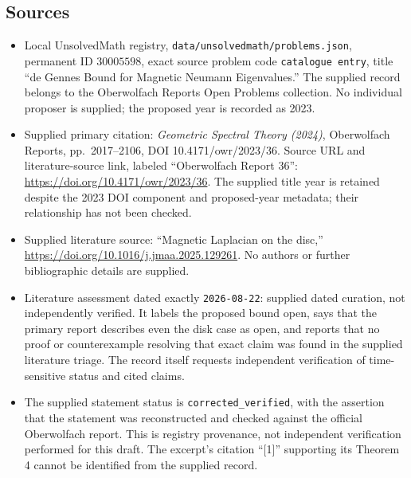 \documentclass[11pt]{article}
\begin{document}
\subsection{Sources}
\begin{itemize}
\item Local UnsolvedMath registry, \texttt{data/unsolvedmath/problems.json}, permanent ID \(30005598\), exact source problem code \texttt{catalogue entry}, title ``de Gennes Bound for Magnetic Neumann Eigenvalues.'' The supplied record belongs to the Oberwolfach Reports Open Problems collection. No individual proposer is supplied; the proposed year is recorded as 2023.
\item Supplied primary citation: \emph{Geometric Spectral Theory (2024)}, Oberwolfach Reports, pp.\ 2017--2106, DOI 10.4171/owr/2023/36. Source URL and literature-source link, labeled ``Oberwolfach Report 36'': \url{https://doi.org/10.4171/owr/2023/36}. The supplied title year is retained despite the 2023 DOI component and proposed-year metadata; their relationship has not been checked.
\item Supplied literature source: ``Magnetic Laplacian on the disc,'' \url{https://doi.org/10.1016/j.jmaa.2025.129261}. No authors or further bibliographic details are supplied.
\item Literature assessment dated exactly \texttt{2026-08-22}: supplied dated curation, not independently verified. It labels the proposed bound open, says that the primary report describes even the disk case as open, and reports that no proof or counterexample resolving that exact claim was found in the supplied literature triage. The record itself requests independent verification of time-sensitive status and cited claims.
\item The supplied statement status is \texttt{corrected\_verified}, with the assertion that the statement was reconstructed and checked against the official Oberwolfach report. This is registry provenance, not independent verification performed for this draft. The excerpt's citation ``[1]'' supporting its Theorem 4 cannot be identified from the supplied record.
\end{itemize}
\end{document}
